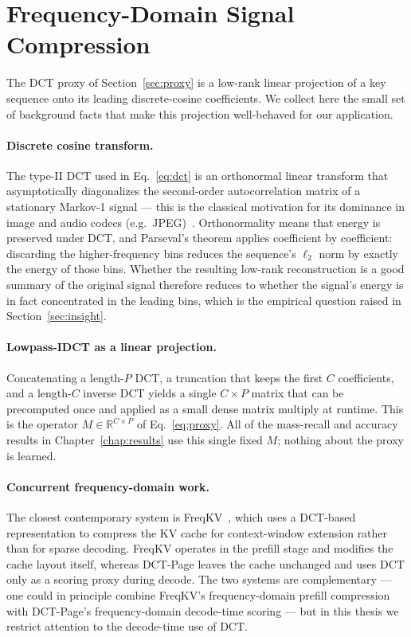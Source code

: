 \section{Frequency-Domain Signal Compression}\label{sec:related-freq}

The DCT proxy of Section~\ref{sec:proxy} is a low-rank linear
projection of a key sequence onto its leading discrete-cosine
coefficients.  We collect here the small set of background facts that
make this projection well-behaved for our application.

\paragraph{Discrete cosine transform.}
The type-II DCT used in Eq.~\eqref{eq:dct} is an orthonormal linear
transform that asymptotically diagonalizes the second-order
autocorrelation matrix of a stationary Markov-1 signal --- this is
the classical motivation for its dominance in image and audio
codecs (e.g.\ JPEG)~\cite{rao1990dct}.  Orthonormality means that energy is
preserved under DCT, and Parseval's theorem applies coefficient by
coefficient: discarding the higher-frequency bins reduces the
sequence's $\ell_2$ norm by exactly the energy of those bins.
Whether the resulting low-rank reconstruction is a good summary of
the original signal therefore reduces to whether the signal's energy
is in fact concentrated in the leading bins, which is the empirical
question raised in Section~\ref{sec:insight}.

\paragraph{Lowpass-IDCT as a linear projection.}
Concatenating a length-$P$ DCT, a truncation that keeps the first $C$
coefficients, and a length-$C$ inverse DCT yields a single
$C \times P$ matrix that can be precomputed once and applied as a
small dense matrix multiply at runtime.  This is the operator
$M \in \mathbb{R}^{C \times P}$ of Eq.~\eqref{eq:proxy}.  All of the
mass-recall and accuracy results in Chapter~\ref{chap:results} use
this single fixed $M$; nothing about the proxy is learned.

\paragraph{Concurrent frequency-domain work.}
The closest contemporary system is
FreqKV~\cite{kai2026freqkv}, which uses a DCT-based representation
to compress the KV cache for context-window extension rather than
for sparse decoding.  FreqKV operates in the prefill stage and
modifies the cache layout itself, whereas DCT-Page leaves the cache
unchanged and uses DCT only as a scoring proxy during decode.  The
two systems are complementary --- one could in principle combine
FreqKV's frequency-domain prefill compression with DCT-Page's
frequency-domain decode-time scoring --- but in this thesis we
restrict attention to the decode-time use of DCT.
